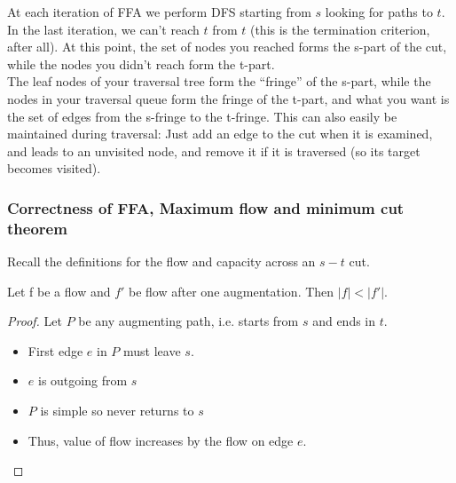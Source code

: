\documentclass[a4paper]{article}
\begin{document}
At each iteration of FFA we perform DFS starting from $s$ looking for paths to $t$. In the last iteration, we can't reach $t$ from $t$ (this is the termination criterion, after all). At this point, the set of nodes you reached forms the s-part of the cut, while the nodes you didn't reach form the t-part.\\
The leaf nodes of your traversal tree form the “fringe” of the s-part, while the nodes in your traversal queue form the fringe of the t-part, and what you want is the set of edges from the s-fringe to the t-fringe. This can also easily be maintained during traversal: Just add an edge to the cut when it is examined, and leads to an unvisited node, and remove it if it is traversed (so its target becomes visited).

\subsubsection{Correctness of FFA, Maximum flow and minimum cut theorem}



Recall the definitions for the flow and capacity across an $s-t$ cut.

\begin{lemma}
Let f be a flow and $f'$ be flow after one augmentation. Then
$\left|f\right| < \left|f'\right|.$
\end{lemma}
\begin{proof}
Let $P$ be any augmenting path, i.e. starts from $s$ and ends in $t$.
\begin{itemize}
    \item First edge $e$ in $P$ must leave $s$.
    \item $e$ is outgoing from $s$
    \item $P$ is simple so never returns to $s$
    \item Thus, value of flow increases by the flow on edge $e$.
\end{itemize}
\end{proof}
\end{document}
